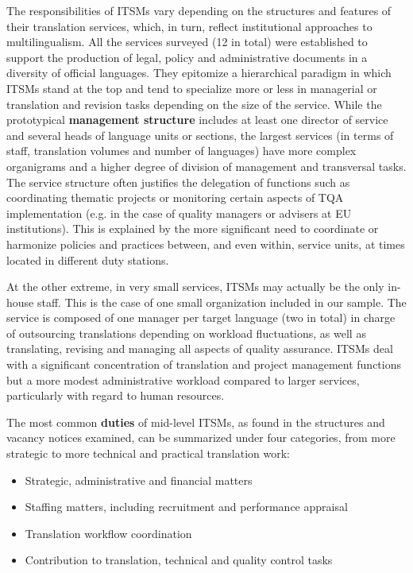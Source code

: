 \documentclass[output=paper]{langsci/langscibook}
\begin{document}
The responsibilities of ITSMs vary depending on the structures and features of their translation services, which, in turn, reflect institutional approaches to multilingualism. All the services surveyed (12 in total) were established to support the production of legal, policy and administrative documents in a diversity of official languages. They epitomize a hierarchical paradigm in which ITSMs stand at the top and tend to specialize more or less in managerial or translation and revision tasks depending on the size of the service. While the prototypical \textbf{management structure} includes at least one director of service and several heads of language units or sections, the largest services (in terms of staff, translation volumes and number of languages) have more complex organigrams and a higher degree of division of management and transversal tasks. The service structure often justifies the delegation of functions such as coordinating thematic projects or monitoring certain aspects of TQA implementation (e.g. in the case of quality managers or advisers at EU institutions). This is explained by the more significant need to coordinate or harmonize policies and practices between, and even within, service units, at times located in different duty stations. 



At the other extreme, in very small services, ITSMs may actually be the only in-house staff. This is the case of one small organization included in our sample. The service is composed of one manager per target language (two in total) in charge of outsourcing translations depending on workload fluctuations, as well as translating, revising and managing all aspects of quality assurance. ITSMs deal with a significant concentration of translation and project management functions but a more modest administrative workload compared to larger services, particularly with regard to human resources.



The most common \textbf{duties} of mid-level ITSMs, as found in the structures and vacancy notices examined, can be summarized under four categories, from more strategic to more technical and practical translation work:


\begin{itemize}
\item 
Strategic, administrative and financial matters
\item 
Staffing matters, including recruitment and performance appraisal
\item 
Translation workflow coordination  
\item 
Contribution to translation, technical and quality control tasks
\end{itemize}
\end{document}
